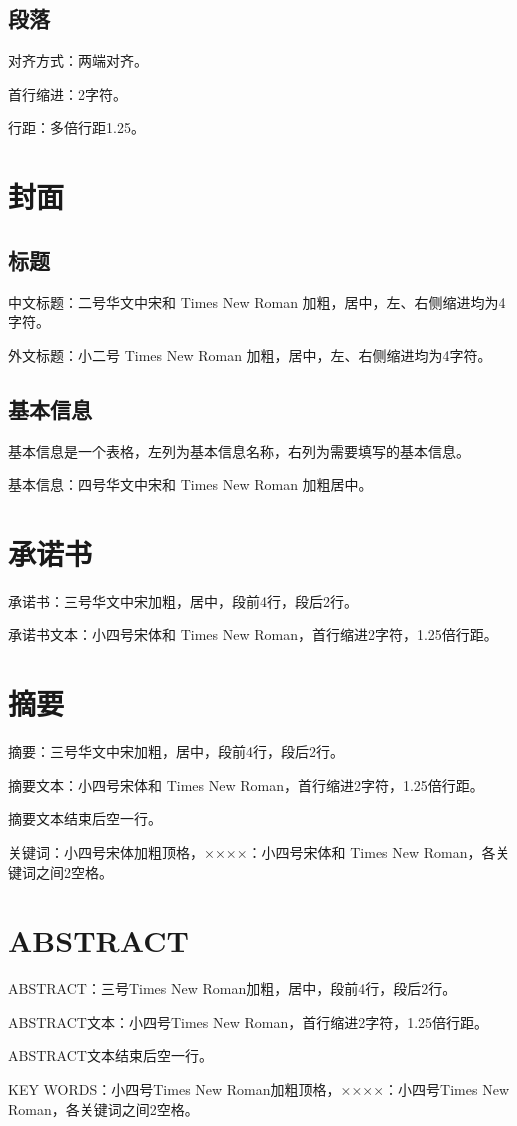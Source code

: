 \subsection{段落}
\par 对齐方式：两端对齐。
\par 首行缩进：2字符。
\par 行距：多倍行距1.25。

\section{封面}
\subsection{标题}
\par 中文标题：二号华文中宋和 Times New Roman 加粗，居中，左、右侧缩进均为4字符。
\par 外文标题：小二号 Times New Roman 加粗，居中，左、右侧缩进均为4字符。

\subsection{基本信息}
\par 基本信息是一个表格，左列为基本信息名称，右列为需要填写的基本信息。
\par 基本信息：四号华文中宋和 Times New Roman 加粗居中。

\section{承诺书}
\par 承诺书：三号华文中宋加粗，居中，段前4行，段后2行。
\par 承诺书文本：小四号宋体和 Times New Roman，首行缩进2字符，1.25倍行距。

\section{摘要}
\par 摘要：三号华文中宋加粗，居中，段前4行，段后2行。
\par 摘要文本：小四号宋体和 Times New Roman，首行缩进2字符，1.25倍行距。
\par 摘要文本结束后空一行。
\par 关键词：小四号宋体加粗顶格，××××：小四号宋体和 Times New Roman，各关键词之间2空格。

\section{ABSTRACT}
\par ABSTRACT：三号Times New Roman加粗，居中，段前4行，段后2行。
\par ABSTRACT文本：小四号Times New Roman，首行缩进2字符，1.25倍行距。
\par ABSTRACT文本结束后空一行。
\par KEY WORDS：小四号Times New Roman加粗顶格，××××：小四号Times New Roman，各关键词之间2空格。

